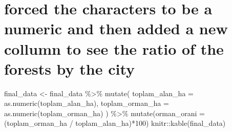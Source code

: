 \documentclass[
  11pt,
  a4paper,
  DIV=11,
  numbers=noendperiod]{scrartcl}
\newenvironment{Shaded}{\begin{snugshade}}{\end{snugshade}}
\newcommand{\AttributeTok}[1]{\textcolor[rgb]{0.40,0.45,0.13}{#1}}
\newcommand{\DecValTok}[1]{\textcolor[rgb]{0.68,0.00,0.00}{#1}}
\newcommand{\FunctionTok}[1]{\textcolor[rgb]{0.28,0.35,0.67}{#1}}
\newcommand{\NormalTok}[1]{\textcolor[rgb]{0.00,0.23,0.31}{#1}}
\newcommand{\OtherTok}[1]{\textcolor[rgb]{0.00,0.23,0.31}{#1}}
\newcommand{\SpecialCharTok}[1]{\textcolor[rgb]{0.37,0.37,0.37}{#1}}
\begin{document}
\section{forced the characters to be a numeric and then added a new
collumn to see the ratio of the forests by the
city}\label{forced-the-characters-to-be-a-numeric-and-then-added-a-new-collumn-to-see-the-ratio-of-the-forests-by-the-city}

\begin{Shaded}
\begin{Highlighting}[]
\NormalTok{final\_data }\OtherTok{\textless{}{-}}\NormalTok{ final\_data }\SpecialCharTok{\%\textgreater{}\%}
  \FunctionTok{mutate}\NormalTok{(}
    \AttributeTok{toplam\_alan\_ha =} \FunctionTok{as.numeric}\NormalTok{(toplam\_alan\_ha),}
    \AttributeTok{toplam\_orman\_ha =} \FunctionTok{as.numeric}\NormalTok{(toplam\_orman\_ha)}
\NormalTok{  ) }\SpecialCharTok{\%\textgreater{}\%}
  \FunctionTok{mutate}\NormalTok{(}\AttributeTok{orman\_orani =}\NormalTok{ (toplam\_orman\_ha }\SpecialCharTok{/}\NormalTok{ toplam\_alan\_ha)}\SpecialCharTok{*}\DecValTok{100}\NormalTok{)}
\NormalTok{knitr}\SpecialCharTok{::}\FunctionTok{kable}\NormalTok{(final\_data)}
\end{Highlighting}
\end{Shaded}
\end{document}
